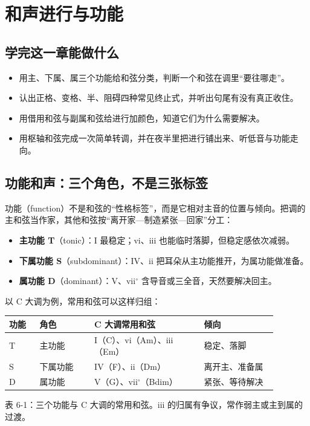 \clearpage
\chapter{和声进行与功能}


\label{sec:harmonic-progression}

\section*{学完这一章能做什么}
\begin{itemize}
  \item 用主、下属、属三个功能给和弦分类，判断一个和弦在调里“要往哪走”。
  \item 认出正格、变格、半、阻碍四种常见终止式，并听出句尾有没有真正收住。
  \item 用借用和弦与副属和弦给进行加颜色，知道它们为什么需要解决。
  \item 用枢轴和弦完成一次简单转调，并在夜半里把进行铺出来、听低音与功能走向。
\end{itemize}

\section{功能和声：三个角色，不是三张标签}

功能（function）不是和弦的“性格标签”，而是它相对主音的位置与倾向。把调的主和弦当作家，其他和弦按“离开家—制造紧张—回家”分工：

\begin{itemize}
  \item \textbf{主功能 T}（tonic）：I 最稳定；vi、iii 也能临时落脚，但稳定感依次减弱。
  \item \textbf{下属功能 S}（subdominant）：IV、ii 把耳朵从主功能推开，为属功能做准备。
  \item \textbf{属功能 D}（dominant）：V、vii$^\circ$ 含导音或三全音，天然要解决回主。
\end{itemize}

以 C 大调为例，常用和弦可以这样归组：

\begin{center}
\small
\begin{tabular}{p{0.10\linewidth}p{0.18\linewidth}p{0.36\linewidth}p{0.24\linewidth}}
\toprule
功能 & 角色 & C 大调常用和弦 & 倾向 \\
\midrule
T & 主功能 & I（C）、vi（Am）、iii（Em） & 稳定、落脚 \\
S & 下属功能 & IV（F）、ii（Dm） & 离开主、准备属 \\
D & 属功能 & V（G）、vii$^\circ$（Bdim） & 紧张、等待解决 \\
\bottomrule
\end{tabular}

表 6-1：三个功能与 C 大调的常用和弦。iii 的归属有争议，常作弱主或主到属的过渡。
\end{center}

